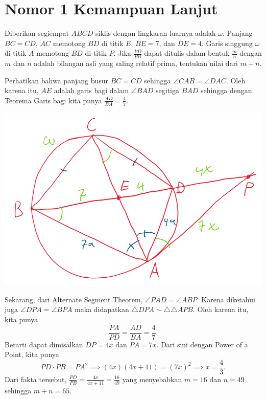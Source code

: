 \documentclass[12pt]{scrartcl}
\begin{document}
\section{Nomor 1 Kemampuan Lanjut}
Diberikan segiempat $ABCD$ siklis dengan lingkaran luarnya adalah $\omega$. Panjang $BC=CD$, $AC$ memotong $BD$ di titik $E$, $BE=7$, dan $DE=4$. Garis singgung $\omega$ di titik $A$ memotong $BD$ di titik $P$. Jika $\frac{PD}{PB}$ dapat ditulis dalam bentuk $\frac{m}{n}$ dengan $m$ dan $n$ adalah bilangan asli yang saling relatif prima, tentukan nilai dari $m+n$.
\begin{solusi}
Perhatikan bahwa panjang busur $BC=CD$ sehingga $\angle CAB = \angle DAC$. Oleh karena itu, $AE$ adalah garis bagi dalam $\angle BAD$ segitiga $BAD$ sehingga dengan Teorema Garis bagi kita punya $\frac{AD}{BA}=\frac{4}{7}$.
\begin{center}
\includegraphics[scale=0.5]{1KL}
\end{center}
Sekarang, dari Alternate Segment Theorem, $\angle PAD = \angle ABP$. Karena diketahui juga $\angle DPA = \angle BPA$ maka didapatkan $\triangle DPA \sim \triangle \triangle APB$. Oleh karena itu, kita punya
$$\frac{PA}{PD} = \frac{AD}{BA} = \frac{4}{7}.$$
Berarti dapat dimisalkan $DP=4x$ dan $PA=7x$. Dari sini dengan Power of a Point, kita punya
$$PD \cdot PB = PA^2 \implies (4x)(4x+11) = (7x)^2 \implies x = \frac{4}{3}.$$
Dari fakta tersebut, $\frac{PD}{PB} = \frac{4x}{4x+11}=\frac{16}{49}$ yang menyebabkan $m=16$ dan $n=49$ sehingga $m+n=\boxed{65}$.
\end{solusi}
\end{document}

